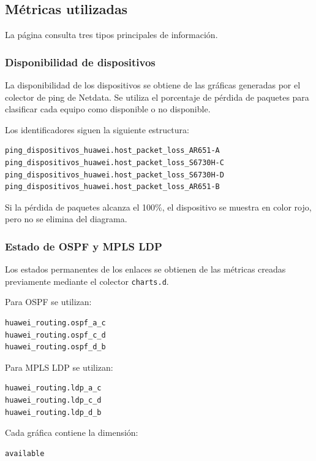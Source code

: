 \subsection{Métricas utilizadas}

La página consulta tres tipos principales de información.

\subsubsection{Disponibilidad de dispositivos}

La disponibilidad de los dispositivos se obtiene de las gráficas generadas por
el colector de ping de Netdata. Se utiliza el porcentaje de pérdida de paquetes
para clasificar cada equipo como disponible o no disponible.

Los identificadores siguen la siguiente estructura:

\begin{lstlisting}[style=terminal]
ping_dispositivos_huawei.host_packet_loss_AR651-A
ping_dispositivos_huawei.host_packet_loss_S6730H-C
ping_dispositivos_huawei.host_packet_loss_S6730H-D
ping_dispositivos_huawei.host_packet_loss_AR651-B
\end{lstlisting}

Si la pérdida de paquetes alcanza el 100\%, el dispositivo se muestra en color
rojo, pero no se elimina del diagrama.

\subsubsection{Estado de OSPF y MPLS LDP}

Los estados permanentes de los enlaces se obtienen de las métricas creadas
previamente mediante el colector \texttt{charts.d}.

Para OSPF se utilizan:

\begin{lstlisting}[style=terminal]
huawei_routing.ospf_a_c
huawei_routing.ospf_c_d
huawei_routing.ospf_d_b
\end{lstlisting}

Para MPLS LDP se utilizan:

\begin{lstlisting}[style=terminal]
huawei_routing.ldp_a_c
huawei_routing.ldp_c_d
huawei_routing.ldp_d_b
\end{lstlisting}

Cada gráfica contiene la dimensión:

\begin{lstlisting}[style=terminal]
available
\end{lstlisting}

